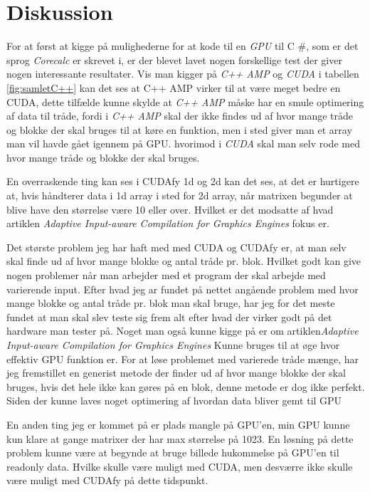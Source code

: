 \section{Diskussion}
For at først at kigge på mulighederne for at kode til en \textit{GPU} til C \#, som er det sprog \textit{Corecalc} er skrevet i, er der blevet lavet nogen forskellige test der giver nogen interessante resultater. Vis man kigger på \textit{C++ AMP} og \textit{CUDA} i tabellen \ref{fig:samletC++} kan det ses at C++ AMP virker til at være meget bedre en CUDA, dette tilfælde kunne skylde at \textit{C++ AMP} måske har en smule optimering af data til tråde, fordi i \textit{C++ AMP} skal der ikke findes ud af hvor mange tråde og blokke der skal bruges til at køre en funktion, men i sted giver man et array man vil havde gået igennem på GPU. hvorimod i \textit{CUDA} skal man selv rode med hvor mange tråde og blokke der skal bruges.

En overraskende ting kan ses i CUDAfy 1d og 2d kan det ses, at det er hurtigere at, hvis håndterer data i 1d array i sted for 2d array, når matrixen begunder at blive have den størrelse være 10 eller over. Hvilket er det modsatte af hvad artiklen \textit{Adaptive Input-aware Compilation for Graphics Engines}\cite{samadi2012adaptive} fokus er.

Det største problem jeg har haft med med CUDA og CUDAfy er, at man selv skal finde ud af hvor mange blokke og antal tråde pr. blok. Hvilket godt kan give nogen problemer når man arbejder med et program der skal arbejde med varierende input. Efter hvad jeg ar fundet på nettet angående problem med hvor mange blokke og antal tråde pr. blok man skal bruge, har jeg for det meste fundet at man skal slev teste sig frem alt efter hvad der virker godt på det hardware man tester på. Noget man også kunne kigge på er om artiklen\textit{Adaptive Input-aware Compilation for Graphics Engines}\cite{samadi2012adaptive} Kunne bruges til at øge hvor effektiv GPU funktion er. For at løse problemet med varierede tråde mænge, har jeg fremstillet en generist metode der finder ud af hvor mange blokke der skal bruges, hvis det hele ikke kan gøres på en blok, denne metode er dog ikke perfekt. Siden der kunne laves noget optimering af hvordan data bliver gemt til GPU

En anden ting jeg er kommet på er plads mangle på GPU'en, min GPU kunne kun klare at gange matrixer der har max størrelse på 1023. En løsning på dette problem kunne være at begynde at bruge billede hukommelse på GPU'en til readonly data. Hvilke skulle være muligt med CUDA, men desværre ikke skulle være muligt med CUDAfy på dette tidspunkt.

